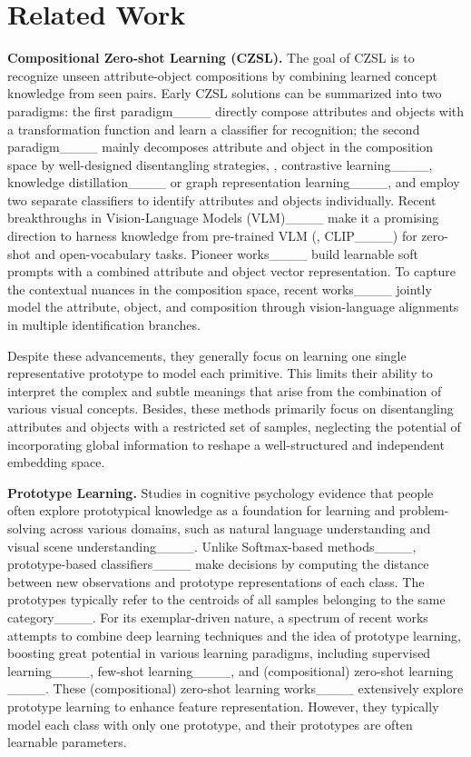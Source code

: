 \section{Related Work}
\label{sec:related}
\noindent\textbf{Compositional Zero-shot Learning (CZSL).} The goal of CZSL is to recognize unseen attribute-object compositions by combining learned concept knowledge from seen pairs. Early CZSL solutions can be summarized into two paradigms: the first paradigm____ directly compose attributes and objects with a transformation function and learn a classifier for recognition; the second paradigm____ mainly decomposes attribute and object in the composition space by well-designed disentangling strategies, \eg, contrastive learning____, knowledge distillation____ or graph representation learning____, and employ two separate classifiers to identify attributes and objects individually. 
Recent breakthroughs in Vision-Language Models (VLM)____ make it a promising direction to harness knowledge from pre-trained VLM (\eg, CLIP____) for zero-shot and open-vocabulary tasks. 
Pioneer works____ build learnable soft prompts with a combined attribute and object vector representation.
To capture the contextual nuances in the composition space, recent works____ jointly model the attribute, object, and composition through vision-language alignments in multiple identification branches.

Despite these advancements, they generally focus on learning one single representative prototype to model each primitive. This limits their ability to interpret the complex and subtle meanings that arise from the combination of various visual concepts. 
Besides, these methods primarily focus on disentangling attributes and objects with a restricted set of samples, neglecting the potential of incorporating global information to reshape a well-structured and independent embedding space. 

\noindent\textbf{Prototype Learning.} Studies in cognitive psychology evidence that people often explore prototypical knowledge as a foundation for learning and problem-solving across various domains, such as natural language understanding and visual scene understanding____.
Unlike Softmax-based methods____, prototype-based classifiers____ make decisions by computing the distance between new observations and prototype representations of each class. 
The prototypes typically refer to the centroids of all samples belonging to the same category____. 
For its exemplar-driven nature, a spectrum of recent works attempts to combine deep learning techniques and the idea of prototype learning, boosting great potential in various learning paradigms, including supervised learning____, few-shot learning____, and (compositional) zero-shot learning ____.  These (compositional) zero-shot learning works____ extensively explore prototype learning to enhance feature representation. However, they typically model each class with only one prototype, and their prototypes are often learnable parameters.

